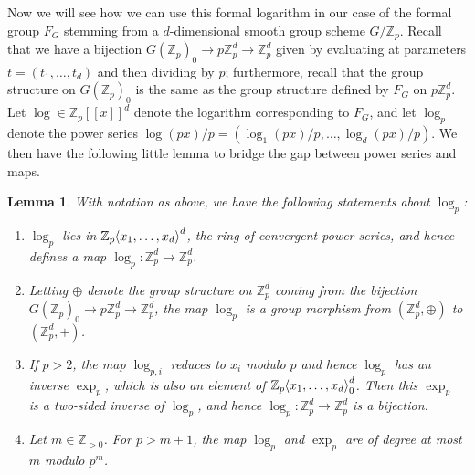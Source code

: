 \documentclass[12pt]{article}
\newcommand{\Z}{\mathbb{Z}}
\renewcommand{\angle}[1]{\hspace{-2pt}\left\langle #1 \right\rangle}
\theoremstyle{plain}
\newtheorem{lem}[thm]{Lemma} %
\theoremstyle{definition}
\theoremstyle{remark}
\begin{document}
Now we will see how we can use this formal logarithm in our case of the formal group $F_G$ stemming from a $d$-dimensional smooth group scheme $G/\Z_p$. Recall that we have a bijection $G(\Z_p)_0 \to p\Z_p^d \to \Z_p^d$ given by evaluating at parameters $t = (t_1,\dots,t_d)$ and then dividing by $p$; furthermore, recall that the group structure on $G(\Z_p)_0$ is the same as the group structure defined by $F_G$ on $p\Z_p^d$. Let $\log \in \Z_p[[x]]^d$ denote the logarithm corresponding to $F_G$, and let $\log_p$ denote the power series $\log(px)/p = (\log_1(px)/p,\dots,\log_d(px)/p)$. We then have the following little lemma to bridge the gap between power series and maps.
\begin{lem}
\label{lem:formallog}
With notation as above, we have the following statements about $\log_p$:
\begin{enumerate}
	\item $\log_p$ lies in $\Z_p\angle{x_1,\dots,x_d}^d$, the ring of convergent power series, and hence defines a map $\log_p: \Z_p^d \to \Z_p^d$.
	\item Letting $\oplus$ denote the group structure on $\Z_p^d$ coming from the bijection $G(\Z_p)_0 \to p\Z_p^d \to \Z_p^d$, the map $\log_p$ is a group morphism from $(\Z_p^d,\oplus)$ to $(\Z_p^d,+)$.
	\item If $p > 2$, the map $\log_{p,i}$ reduces to $x_i$ modulo $p$ and hence $\log_p$ has an inverse $\exp_p$, which is also an element of $\Z_p\angle{x_1,\dots,x_d}_0^d$. Then this $\exp_p$ is a two-sided inverse of $\log_p$, and hence $\log_p: \Z_p^d \to \Z_p^d$ is a bijection.
	\item Let $m \in \Z_{>0}$. For $p > m+1$, the map $\log_p$ and $\exp_p$ are of degree at most $m$ modulo $p^m$.
\end{enumerate} 
\end{lem}
\end{document}
